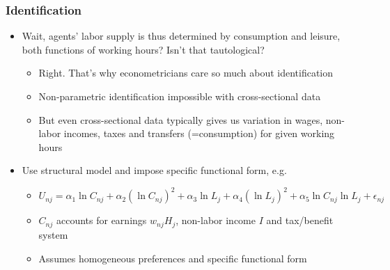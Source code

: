\documentclass[handout,intlimits]{beamer}
\def\litc#1{\textcolor{med-gray}{\tiny\citep{#1}}}
\def\blue#1{\textcolor{zewblue}{#1}}
\begin{document}
\begin{frame}
\frametitle{Identification}
\begin{itemize}
	\item \blue{Wait, agents' labor supply is thus determined by consumption and leisure, both functions of working hours?} Isn't that tautological?
	\begin{itemize}
		\item Right. That's why econometricians care so much about identification
		\smallskip
		\item Non-parametric identification impossible with cross-sectional data \litc{manski_2014}
		\smallskip
		\item But even cross-sectional data typically gives us variation in wages, non-labor incomes, taxes and transfers (=consumption) for given working hours
	\end{itemize}
	\bigskip
	\item \blue{Use structural model and impose specific functional form}, e.g.
	\begin{itemize}
		\item $U_{nj} = \alpha_1 \ln C_{nj} + \alpha_2 (\ln C_{nj})^2 + \alpha_3 \ln L_j + \alpha_4 (\ln L_j)^2 + \alpha_5  \ln C_{nj} \ln L_j + \epsilon_{nj}$
		\smallskip
		\item $C_{nj}$ accounts for earnings $w_{nj}H_j$, non-labor income $I$ and tax/benefit system
		\smallskip
		\item Assumes homogeneous preferences and specific functional form
	\end{itemize}
\end{itemize}
\end{frame}
\end{document}
